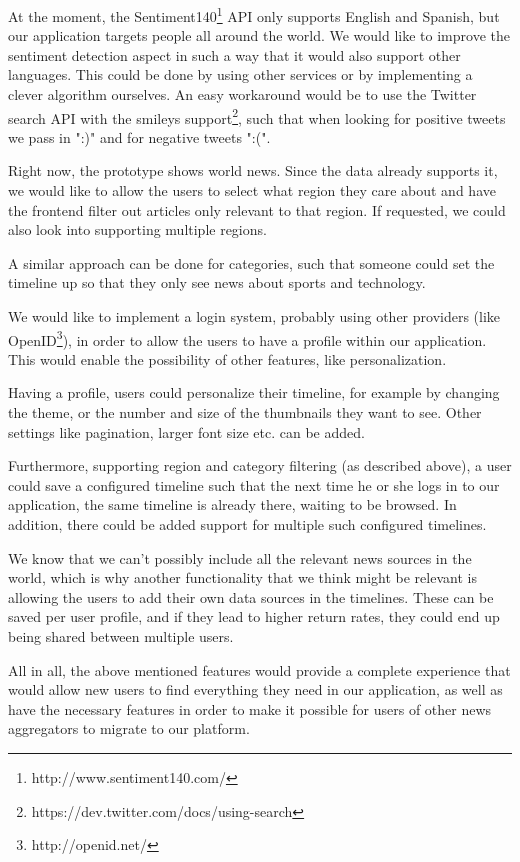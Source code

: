 \documentclass{acm_proc_10ptArticle-sp}
\begin{document}
At the moment, the Sentiment140\footnote{http://www.sentiment140.com/} API only supports English and Spanish, but our application targets people all around the world. We would like to improve the sentiment detection aspect in such a way that it would also support other languages. This could be done by using other services or by implementing a clever algorithm ourselves. An easy workaround would be to use the Twitter search API with the smileys support\footnote{https://dev.twitter.com/docs/using-search}, such that when looking for positive tweets we pass in ":)" and for negative tweets ":(".

Right now, the prototype shows world news. Since the data already supports it, we would like to allow the users to select what region they care about and have the frontend filter out articles only relevant to that region. If requested, we could also look into supporting multiple regions.

A similar approach can be done for categories, such that someone could set the timeline up so that they only see news about sports and technology.

We would like to implement a login system, probably using other providers (like OpenID\footnote{http://openid.net/}), in order to allow the users to have a profile within our application. This would enable the possibility of other features, like personalization.

Having a profile, users could personalize their timeline, for example by changing the theme, or the number and size of the thumbnails they want to see. Other settings like pagination, larger font size etc. can be added.

Furthermore, supporting region and category filtering (as described above), a user could save a configured timeline such that the next time he or she logs in to our application, the same timeline is already there, waiting to be browsed. In addition, there could be added support for multiple such configured timelines.

We know that we can't possibly include all the relevant news sources in the world, which is why another functionality that we think might be relevant is allowing the users to add their own data sources in the timelines. These can be saved per user profile, and if they lead to higher return rates, they could end up being shared between multiple users.

All in all, the above mentioned features would provide a complete experience that would allow new users to find everything they need in our application, as well as have the necessary features in order to make it possible for users of other news aggregators to migrate to our platform.
\end{document}
